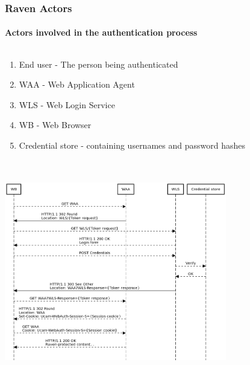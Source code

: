 \documentclass[handout, aspectratio=169, notes=hide]{beamer}
\begin{document}

\begin{frame}
\frametitle{Raven Actors}
\framesubtitle{Actors involved in the authentication process}
\setlength{\parskip}{1.0em}
\centering
\begin{columns}[T]
\begin{column}[T]{1.0\textwidth}
\begin{enumerate}
\setlength{\parskip}{1.0em}
\item End user - The person being authenticated
\item WAA - Web Application Agent
\item WLS - Web Login Service
\item WB - Web Browser
\item Credential store - containing usernames and password hashes
\end{enumerate}
\end{column}
\end{columns}

\end{frame}
\note{
}


\begin{frame}
\frametitle{}
\framesubtitle{}
\setlength{\parskip}{1.0em}
\begin{columns}[T]
\begin{column}[T]{1.0\textwidth}	
\vspace{-1.7cm}
\includegraphics[width=0.76\textwidth,center]{ucam_webauth}
\end{column}
\begin{column}[T]{0.0\textwidth}
\end{column}
\end{columns}

\end{frame}
\note{
}
\end{document}
